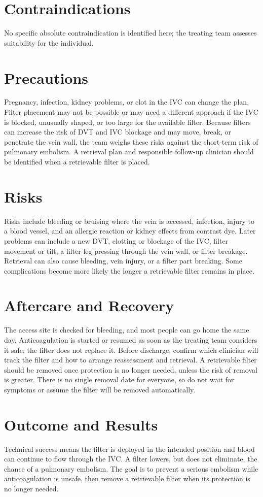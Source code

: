 \section*{Contraindications}
No specific absolute contraindication is identified here; the treating team assesses suitability for the individual.

\section*{Precautions}
Pregnancy, infection, kidney problems, or clot in the IVC can change the plan. Filter placement may not be possible or may need a different approach if the IVC is blocked, unusually shaped, or too large for the available filter. Because filters can increase the risk of DVT and IVC blockage and may move, break, or penetrate the vein wall, the team weighs these risks against the short-term risk of pulmonary embolism. A retrieval plan and responsible follow-up clinician should be identified when a retrievable filter is placed.

\section*{Risks}
Risks include bleeding or bruising where the vein is accessed, infection, injury to a blood vessel, and an allergic reaction or kidney effects from contrast dye. Later problems can include a new DVT, clotting or blockage of the IVC, filter movement or tilt, a filter leg pressing through the vein wall, or filter breakage. Retrieval can also cause bleeding, vein injury, or a filter part breaking. Some complications become more likely the longer a retrievable filter remains in place.

\section*{Aftercare and Recovery}
The access site is checked for bleeding, and most people can go home the same day. Anticoagulation is started or resumed as soon as the treating team considers it safe; the filter does not replace it. Before discharge, confirm which clinician will track the filter and how to arrange reassessment and retrieval. A retrievable filter should be removed once protection is no longer needed, unless the risk of removal is greater. There is no single removal date for everyone, so do not wait for symptoms or assume the filter will be removed automatically.

\section*{Outcome and Results}
Technical success means the filter is deployed in the intended position and blood can continue to flow through the IVC. A filter lowers, but does not eliminate, the chance of a pulmonary embolism. The goal is to prevent a serious embolism while anticoagulation is unsafe, then remove a retrievable filter when its protection is no longer needed.

